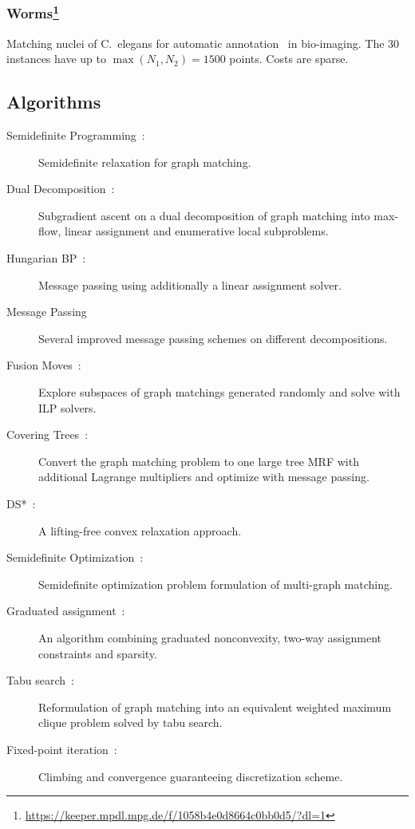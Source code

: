 \subsubsection[Worms]{Worms\footnote{\url{https://keeper.mpdl.mpg.de/f/1058b4e0d8664c0bb0d5/?dl=1}}}
Matching nuclei of C.\ elegans for automatic annotation~\cite{kainmueller2014active} in bio-imaging. 
The 30 instances have up to $\max(N_1,N_2) = 1500$ points. Costs are sparse.


\subsection{Algorithms}
\begin{description}
\item[Semidefinite Programming~\cite{schellewald2005probabilistic}:]
    Semidefinite relaxation for graph matching.
\item[Dual Decomposition~\cite{torresani2012dual}:]
Subgradient ascent on a dual decomposition of graph matching into max-flow, linear assignment and enumerative local subproblems.
\item[Hungarian BP~\cite{zhang2016pairwise}:]
Message passing using additionally a linear assignment solver.
\item[Message Passing~\cite{swoboda2017study}]
Several improved message passing schemes on different decompositions.
\item[Fusion Moves~\cite{hutschenreiter2021fusion}:] Explore subspaces of graph matchings generated randomly and solve with ILP solvers.
\item[Covering Trees~\cite{yarkony2010covering}:] Convert the graph matching problem to one large tree MRF with additional Lagrange multipliers and optimize with message passing.
\item[DS*~\cite{bernard2018ds}:]
    A lifting-free convex relaxation approach.
\item[Semidefinite Optimization~\cite{kezurer2015tight}:]
    Semidefinite optimization problem formulation of multi-graph matching.
\item[Graduated assignment~\cite{gold1996graduated}:]
    An algorithm combining graduated nonconvexity, two-way assignment constraints and sparsity.
\item[Tabu search~\cite{adamczewski2015discrete}:]
    Reformulation of graph matching into an equivalent weighted maximum clique problem solved by tabu search.
\item[Fixed-point iteration~\cite{leordeanu2009integer}:]
    Climbing and convergence guaranteeing discretization scheme.

\end{description}
